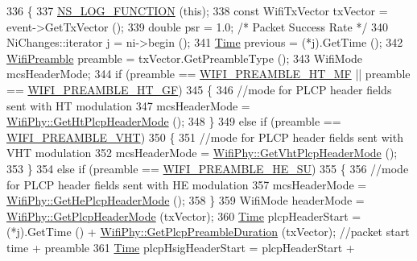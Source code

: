 \begin{DoxyCode}
336 \{
337   \hyperlink{log-macros-disabled_8h_a90b90d5bad1f39cb1b64923ea94c0761}{NS\_LOG\_FUNCTION} (\textcolor{keyword}{this});
338   \textcolor{keyword}{const} WifiTxVector txVector = \textcolor{keyword}{event}->GetTxVector ();
339   \textcolor{keywordtype}{double} psr = 1.0; \textcolor{comment}{/* Packet Success Rate */}
340   NiChanges::iterator j = ni->begin ();
341   \hyperlink{namespacens3_1_1TracedValueCallback_a7ffd3e7c142ffe7c8a1d2db9b8de38ec}{Time} previous = (*j).GetTime ();
342   \hyperlink{group__wifi_ga5e94a56cb338a14ffbbb19c6a41251eb}{WifiPreamble} preamble = txVector.GetPreambleType ();
343   WifiMode mcsHeaderMode;
344   \textcolor{keywordflow}{if} (preamble == \hyperlink{group__wifi_gga5e94a56cb338a14ffbbb19c6a41251ebae0944a664debb28943c12d4cd7a81d2a}{WIFI\_PREAMBLE\_HT\_MF} || preamble == 
      \hyperlink{group__wifi_gga5e94a56cb338a14ffbbb19c6a41251eba82e0b00d79c1f01b7a6e46b693bafd72}{WIFI\_PREAMBLE\_HT\_GF})
345     \{
346       \textcolor{comment}{//mode for PLCP header fields sent with HT modulation}
347       mcsHeaderMode = \hyperlink{classns3_1_1WifiPhy_a525347c5aef8d9181d0a216fa853d939}{WifiPhy::GetHtPlcpHeaderMode} ();
348     \}
349   \textcolor{keywordflow}{else} \textcolor{keywordflow}{if} (preamble == \hyperlink{group__wifi_gga5e94a56cb338a14ffbbb19c6a41251ebab90b0fe0b17f27e51c0fe16239e7b089}{WIFI\_PREAMBLE\_VHT})
350     \{
351       \textcolor{comment}{//mode for PLCP header fields sent with VHT modulation}
352       mcsHeaderMode = \hyperlink{classns3_1_1WifiPhy_a6e8d499f550e6cc62312f4fd31643a45}{WifiPhy::GetVhtPlcpHeaderMode} ();
353     \}
354   \textcolor{keywordflow}{else} \textcolor{keywordflow}{if} (preamble == \hyperlink{group__wifi_gga5e94a56cb338a14ffbbb19c6a41251eba99c3e12c6e91fc9a9bee491d20dab807}{WIFI\_PREAMBLE\_HE\_SU})
355     \{
356       \textcolor{comment}{//mode for PLCP header fields sent with HE modulation}
357       mcsHeaderMode = \hyperlink{classns3_1_1WifiPhy_ac03874b0aabf1d54396c79b20d546737}{WifiPhy::GetHePlcpHeaderMode} ();
358     \}
359   WifiMode headerMode = \hyperlink{classns3_1_1WifiPhy_ac6b531ab3bc66265bd2eb8b627ff60f7}{WifiPhy::GetPlcpHeaderMode} (txVector);
360   \hyperlink{namespacens3_1_1TracedValueCallback_a7ffd3e7c142ffe7c8a1d2db9b8de38ec}{Time} plcpHeaderStart = (*j).GetTime () + \hyperlink{classns3_1_1WifiPhy_a46ecb9d93cc8b2085b70f3e0776cbd6f}{WifiPhy::GetPlcpPreambleDuration}
       (txVector); \textcolor{comment}{//packet start time + preamble}
361   \hyperlink{namespacens3_1_1TracedValueCallback_a7ffd3e7c142ffe7c8a1d2db9b8de38ec}{Time} plcpHsigHeaderStart = plcpHeaderStart + 

\end{DoxyCode}

